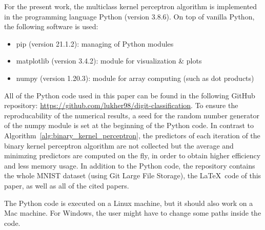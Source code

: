 For the present work, the multiclass kernel perceptron algorithm is implemented in the programming language Python (version 3.8.6).
On top of vanilla Python, the following software is used:
\begin{itemize}
	\item pip (version 21.1.2): managing of Python modules 
	\item matplotlib (version 3.4.2): module for visualization \& plots
	\item numpy (version 1.20.3): module for array computing (such as dot products)
\end{itemize}
All of the Python code used in this paper can be found in the following GitHub repository: \url{https://github.com/lukher98/digit-classification}. To ensure the reproducability of the numerical results, a seed for the random number generator of the numpy module is set at the beginning of the Python code. In contrast to Algorithm~\ref{alg:binary_kernel_perceptron}, the predictors of each iteration of the binary kernel perceptron algorithm are not collected but the average and minimzing predictors are computed on the fly, in order to obtain higher efficiency and less memory usage.
In addition to the Python code, the repository contains the whole MNIST dataset (using Git Large File Storage), the \LaTeX\ code of this paper, as well as all of the cited papers.

The Python code is executed on a Linux machine, but it should also work on a Mac machine. For Windows, the user might have to change some paths inside the code.